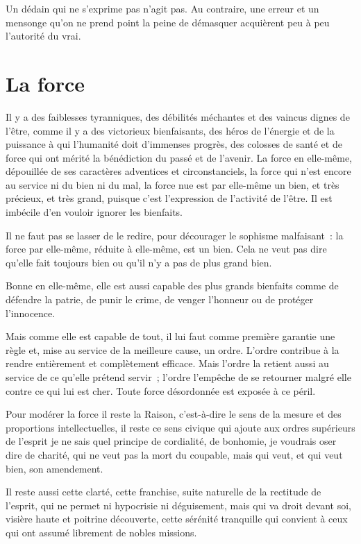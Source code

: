 \documentclass[french,twoside]{book} %
\newcommand{\astermono}{\medskip\centerline{\color{rubric}\large\selectfont{\syms ✻}}\medskip\par}%
\begin{document}
\astermono

\noindent Un dédain qui ne s’exprime pas n’agit pas. Au contraire, une erreur et un mensonge qu’on ne prend point la peine de démasquer acquièrent peu à peu l’autorité du vrai.
\section[La force]{La force}
\noindent Il y a des faiblesses tyranniques, des débilités méchantes et des vaincus dignes de l’être, comme il y a des victorieux bienfaisants, des héros de l’énergie et de la puissance à qui l’humanité doit d’immenses progrès, des colosses de santé et de force qui ont mérité la bénédiction du passé et de l’avenir. La force en elle-même, dépouillée de ses caractères adventices et circonstanciels, la force qui n’est encore au service ni du bien ni du mal, la force nue est par elle-même un bien, et très précieux, et très grand, puisque c’est l’expression de l’activité de l’être. Il est imbécile d’en vouloir ignorer les bienfaits.\par

\astermono

\noindent Il ne faut pas se lasser de le redire, pour décourager le sophisme malfaisant : la force par elle-même, réduite à elle-même, est un bien. Cela ne veut pas dire qu’elle fait toujours bien ou qu’il n’y a pas de plus grand bien.\par
Bonne en elle-même, elle est aussi capable des plus grands bienfaits comme de défendre la patrie, de punir le crime, de venger l’honneur ou de protéger l’innocence.\par
Mais comme elle est capable de tout, il lui faut comme première garantie une règle et, mise au service de la meilleure cause, un ordre. L’ordre contribue à la rendre entièrement et complètement efficace. Mais l’ordre la retient aussi au service de ce qu’elle prétend servir ; l’ordre l’empêche de se retourner malgré elle contre ce qui lui est cher. Toute force désordonnée est exposée à ce péril.\par

\astermono

\noindent Pour modérer la force il reste la Raison, c’est-à-dire le sens de la mesure et des proportions intellectuelles, il reste ce sens civique qui ajoute aux ordres supérieurs de l’esprit je ne sais quel principe de cordialité, de bonhomie, je voudrais oser dire de charité, qui ne veut pas la mort du coupable, mais qui veut, et qui veut bien, son amendement.\par
Il reste aussi cette clarté, cette franchise, suite naturelle de la rectitude de l’esprit, qui ne permet ni hypocrisie ni déguisement, mais qui va droit devant soi, visière haute et poitrine découverte, cette sérénité tranquille qui convient à ceux qui ont assumé librement de nobles missions.\par
\end{document}

